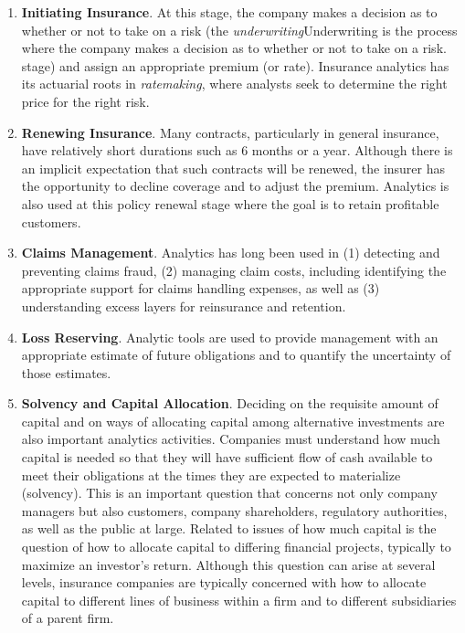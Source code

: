 \documentclass[]{book}
\theoremstyle{definition}
\theoremstyle{definition}
\theoremstyle{definition}
\theoremstyle{remark}
\begin{document}
\begin{enumerate}
\def\labelenumi{\arabic{enumi}.}
\item
  \textbf{Initiating Insurance}. At this stage, the company makes a
  decision as to whether or not to take on a risk (the
  \emph{underwriting}{Underwriting is the process where the company
  makes a decision as to whether or not to take on a risk.} stage) and
  assign an appropriate premium (or rate). Insurance analytics has its
  actuarial roots in \emph{ratemaking}, where analysts seek to determine
  the right price for the right risk.
\item
  \textbf{Renewing Insurance}. Many contracts, particularly in general
  insurance, have relatively short durations such as 6 months or a year.
  Although there is an implicit expectation that such contracts will be
  renewed, the insurer has the opportunity to decline coverage and to
  adjust the premium. Analytics is also used at this policy renewal
  stage where the goal is to retain profitable customers.
\item
  \textbf{Claims Management}. Analytics has long been used in (1)
  detecting and preventing claims fraud, (2) managing claim costs,
  including identifying the appropriate support for claims handling
  expenses, as well as (3) understanding excess layers for reinsurance
  and retention.
\item
  \textbf{Loss Reserving}. Analytic tools are used to provide management
  with an appropriate estimate of future obligations and to quantify the
  uncertainty of those estimates.
\item
  \textbf{Solvency and Capital Allocation}. Deciding on the requisite
  amount of capital and on ways of allocating capital among alternative
  investments are also important analytics activities. Companies must
  understand how much capital is needed so that they will have
  sufficient flow of cash available to meet their obligations at the
  times they are expected to materialize (solvency). This is an
  important question that concerns not only company managers but also
  customers, company shareholders, regulatory authorities, as well as
  the public at large. Related to issues of how much capital is the
  question of how to allocate capital to differing financial projects,
  typically to maximize an investor's return. Although this question can
  arise at several levels, insurance companies are typically concerned
  with how to allocate capital to different lines of business within a
  firm and to different subsidiaries of a parent firm.
\end{enumerate}
\end{document}
